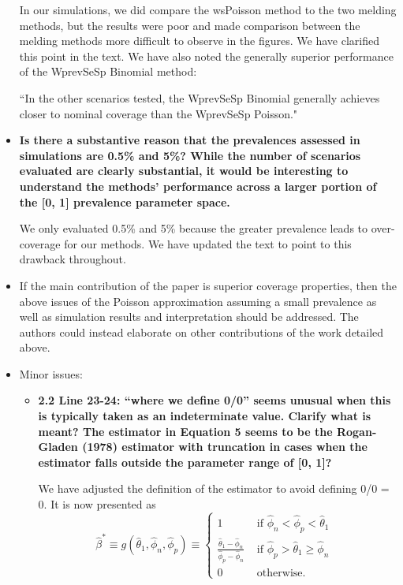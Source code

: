 \documentclass[11pt]{article}
\begin{document}
\begin{itemize}
    In our simulations, we did compare the wsPoisson method to the two melding methods, but the results were poor and made comparison between the melding methods more difficult to observe in the figures.
    We have clarified this point in the text.
    We have also noted the generally superior performance of the WprevSeSp Binomial method:
    
    ``In the other scenarios tested, the WprevSeSp Binomial generally achieves closer to nominal coverage than the WprevSeSp Poisson."

    \item \textbf{Is there a substantive reason that the prevalences assessed in simulations are 0.5\% and 5\%? While the number of scenarios evaluated are clearly substantial, it would be interesting to understand the methods’ performance across a larger portion of the [0, 1] prevalence parameter space.}

    We only evaluated 0.5\% and 5\% because the greater prevalence leads to over-coverage for our methods.
    We have updated the text to point to this drawback throughout.

    \item If the main contribution of the paper is superior coverage properties, then the above issues of the Poisson approximation assuming a small prevalence as well as simulation results and interpretation should be addressed. The authors could instead elaborate on other contributions of the work detailed above.

    \item Minor issues:
    
    \begin{itemize}
        \item \textbf{2.2 Line 23-24: “where we define 0/0” seems unusual when this is typically taken as an indeterminate value. Clarify what is meant? The estimator in Equation 5 seems to be the Rogan-Gladen (1978) estimator with truncation in cases when the estimator falls outside the parameter range of [0, 1]?}
        
        We have adjusted the definition of the estimator to avoid defining 0/0 = 0. It is now presented as
        \begin{equation}
        \hat{\beta}^* \equiv 
        g(\hat{\theta}_1, \hat{\phi}_n, \hat{\phi}_p)
        \equiv 
        \left\{ 
        \begin{array}{ll}
        1 & \mbox{ if $\hat{\phi}_n < \hat{\phi}_p < \hat{\theta}_1$ }  \\
        \frac{\hat{\theta}_1 - \hat{\phi}_n}{\hat{\phi}_p - \hat{\phi}_n} & 
        \mbox{ if $\hat{\phi}_p > \hat{\theta}_1 \geq \hat{\phi}_n$ } \\
        0 & \mbox{ otherwise.} 
        \end{array}
        \right.
        \end{equation}


\end{itemize}
\end{itemize}
\end{document}
